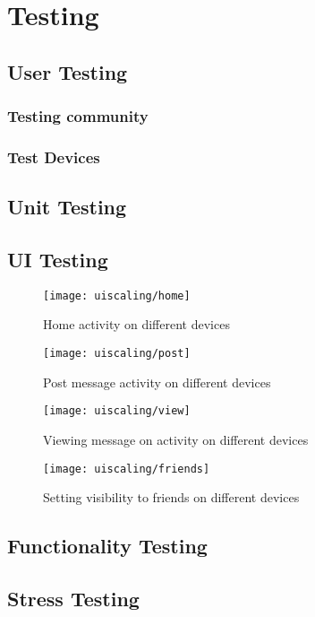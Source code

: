 \chapter{Testing}

\section{User Testing}

\subsection{Testing community}

\subsection{Test Devices}


\section{Unit Testing}

\section{UI Testing}

\begin{figure}[p]
    \centering
    \texttt{[image: uiscaling/home]}
    \caption{Home activity on different devices}
    \label{fig:ui_scaling_home_image}
\end{figure}

\begin{figure}[p]
    \centering
    \texttt{[image: uiscaling/post]}
    \caption{Post message activity on different devices}
    \label{fig:ui_scaling_post_image}
\end{figure}

\begin{figure}[p]
    \centering
    \texttt{[image: uiscaling/view]}
    \caption{Viewing message on activity on different devices}
    \label{fig:ui_scaling_view_image}
\end{figure}

\begin{figure}[p]
    \centering
    \texttt{[image: uiscaling/friends]}
    \caption{Setting visibility to friends on different devices}
    \label{fig:ui_scaling_friends_image}
\end{figure}

\section{Functionality Testing}

\section{Stress Testing}

